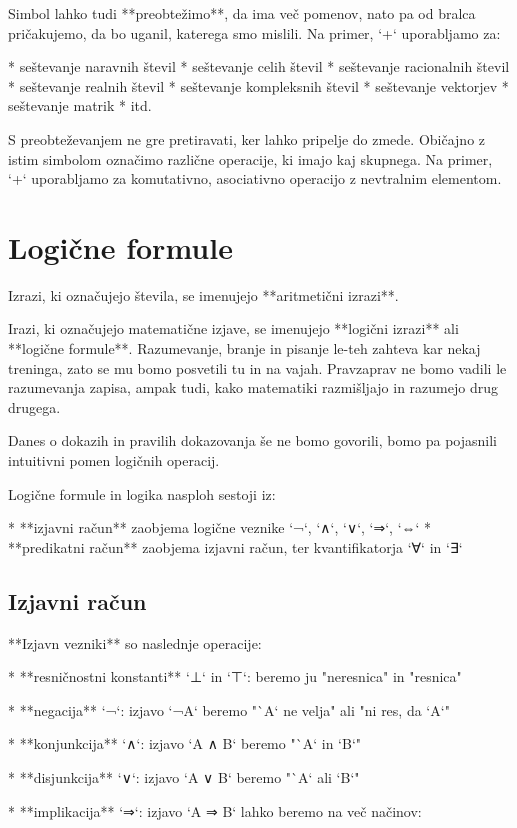 Simbol lahko tudi **preobtežimo**, da ima več pomenov, nato pa od bralca pričakujemo, da bo uganil, katerega smo
mislili. Na primer, `+` uporabljamo za:

* seštevanje naravnih števil
* seštevanje celih števil
* seštevanje racionalnih števil
* seštevanje realnih števil
* seštevanje kompleksnih števil
* seštevanje vektorjev
* seštevanje matrik
* itd.

S preobteževanjem ne gre pretiravati, ker lahko pripelje do zmede. Običajno z istim simbolom označimo različne
operacije, ki imajo kaj skupnega. Na primer, `+` uporabljamo za komutativno, asociativno operacijo z nevtralnim
elementom.


\section{Logične formule}

Izrazi, ki označujejo števila, se imenujejo **aritmetični izrazi**.

Irazi, ki označujejo matematične izjave, se imenujejo **logični izrazi** ali **logične formule**. Razumevanje, branje in pisanje le-teh zahteva kar nekaj treninga, zato se mu bomo posvetili tu in na vajah. Pravzaprav ne bomo vadili le razumevanja zapisa, ampak tudi, kako matematiki razmišljajo in razumejo drug drugega.

Danes o dokazih in pravilih dokazovanja še ne bomo govorili, bomo pa pojasnili intuitivni pomen logičnih operacij.

Logične formule in logika nasploh sestoji iz:

* **izjavni račun** zaobjema logične veznike `¬`, `∧`, `∨`, `⇒`, `⇔`
* **predikatni račun** zaobjema izjavni račun, ter kvantifikatorja `∀` in `∃`


\subsection{Izjavni račun}

**Izjavn vezniki** so naslednje operacije:

* **resničnostni konstanti** `⊥` in `⊤`: beremo ju "neresnica" in "resnica"

* **negacija** `¬`: izjavo `¬A` beremo "`A` ne velja" ali "ni res, da `A`"

* **konjunkcija** `∧`: izjavo `A ∧ B` beremo "`A` in `B`"

* **disjunkcija** `∨`: izjavo `A ∨ B` beremo "`A` ali `B`"

* **implikacija** `⇒`: izjavo `A ⇒ B` lahko beremo na več načinov:

